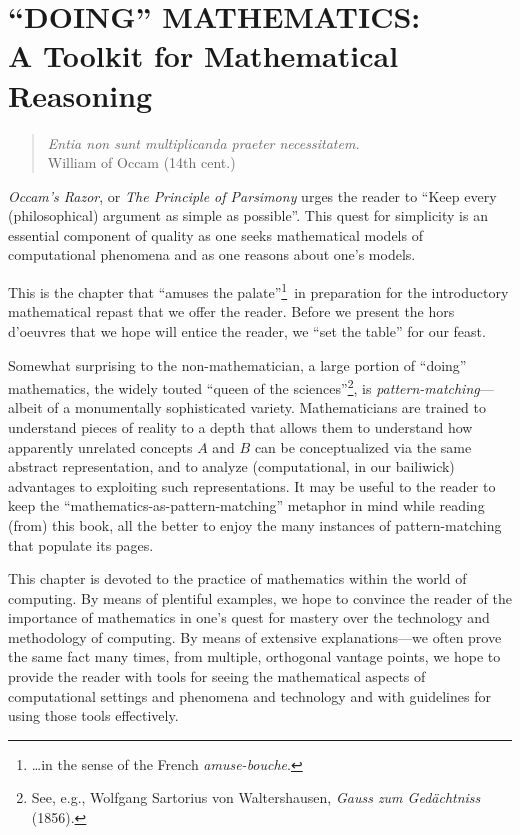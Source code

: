 
\chapter{``DOING'' MATHEMATICS: \\
A Toolkit for Mathematical Reasoning}
\label{ch:doingmath}

\begin{quote}
{\it Entia non sunt multiplicanda praeter necessitatem.} \\
\hspace*{2in}William of Occam (14th cent.)
\end{quote}

{\it Occam's Razor}, or {\it The Principle of Parsimony} urges the
reader to ``Keep every (philosophical) argument as simple as
possible''.  This quest for simplicity is an essential component of
quality as one seeks mathematical models of computational phenomena
and as one reasons about one's models.

This is the chapter that ``amuses the palate''\footnote{\ldots in the
  sense of the French {\em amuse-bouche}.}~in preparation for the
introductory mathematical repast that we offer the reader.  Before we
present the hors d'oeuvres that we hope will entice the reader, we
``set the table'' for our feast.

Somewhat surprising to the non-mathematician, a large portion of
``doing'' mathematics, the widely touted ``queen of the
sciences''\footnote{See, e.g., Wolfgang Sartorius von Waltershausen,
  {\it Gauss zum Ged\"{a}chtniss} (1856).}, is {\em
  pattern-matching}---albeit of a monumentally sophisticated variety.
Mathematicians are trained to understand pieces of reality to a depth
that allows them to understand how apparently unrelated concepts $A$
and $B$ can be conceptualized via the same abstract representation,
and to analyze (computational, in our bailiwick) advantages to
exploiting such representations.  It may be useful to the reader to
keep the ``mathematics-as-pattern-matching'' metaphor in mind while
reading (from) this book, all the better to enjoy the many instances
of pattern-matching that populate its pages.

This chapter is devoted to the practice of mathematics within the
world of computing.  By means of plentiful examples, we hope to
convince the reader of the importance of mathematics in one's quest
for mastery over the technology and methodology of computing.  By
means of extensive explanations---we often prove the same fact many
times, from multiple, orthogonal vantage points, we hope to provide
the reader with tools for seeing the mathematical aspects of
computational settings and phenomena and technology and with
guidelines for using those tools effectively.

